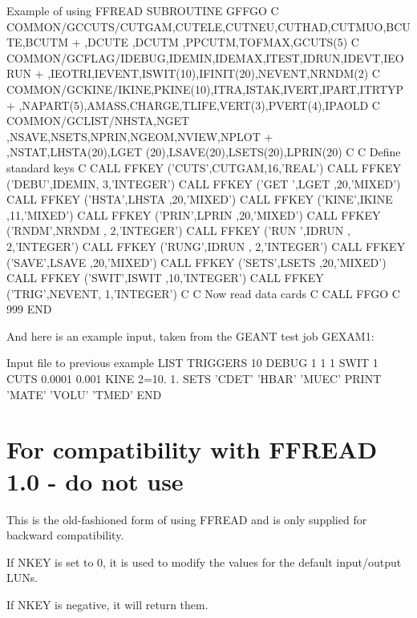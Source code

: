  
\begin{XMPt}{Example of using FFREAD}
      SUBROUTINE GFFGO
C
      COMMON/GCCUTS/CUTGAM,CUTELE,CUTNEU,CUTHAD,CUTMUO,BCUTE,BCUTM
     +             ,DCUTE ,DCUTM ,PPCUTM,TOFMAX,GCUTS(5)
C
      COMMON/GCFLAG/IDEBUG,IDEMIN,IDEMAX,ITEST,IDRUN,IDEVT,IEORUN
     +        ,IEOTRI,IEVENT,ISWIT(10),IFINIT(20),NEVENT,NRNDM(2)
C
      COMMON/GCKINE/IKINE,PKINE(10),ITRA,ISTAK,IVERT,IPART,ITRTYP
     +      ,NAPART(5),AMASS,CHARGE,TLIFE,VERT(3),PVERT(4),IPAOLD
C
      COMMON/GCLIST/NHSTA,NGET ,NSAVE,NSETS,NPRIN,NGEOM,NVIEW,NPLOT
     +       ,NSTAT,LHSTA(20),LGET (20),LSAVE(20),LSETS(20),LPRIN(20)
C
C             Define standard keys
C
      CALL FFKEY ('CUTS',CUTGAM,16,'REAL')
      CALL FFKEY ('DEBU',IDEMIN, 3,'INTEGER')
      CALL FFKEY ('GET ',LGET  ,20,'MIXED')
      CALL FFKEY ('HSTA',LHSTA ,20,'MIXED')
      CALL FFKEY ('KINE',IKINE ,11,'MIXED')
      CALL FFKEY ('PRIN',LPRIN ,20,'MIXED')
      CALL FFKEY ('RNDM',NRNDM , 2,'INTEGER')
      CALL FFKEY ('RUN ',IDRUN , 2,'INTEGER')
      CALL FFKEY ('RUNG',IDRUN , 2,'INTEGER')
      CALL FFKEY ('SAVE',LSAVE ,20,'MIXED')
      CALL FFKEY ('SETS',LSETS ,20,'MIXED')
      CALL FFKEY ('SWIT',ISWIT ,10,'INTEGER')
      CALL FFKEY ('TRIG',NEVENT, 1,'INTEGER')
C
C             Now read data cards
C
      CALL FFGO
C
 999  END

\end{XMPt}
 
 
And here is an example input, taken from the GEANT test job GEXAM1:
 
 
\begin{XMPt}{Input file to previous example}
LIST
TRIGGERS   10
DEBUG     1   1    1
SWIT      1
CUTS  0.0001    0.001
KINE 2=10. 1.
SETS    'CDET' 'HBAR'  'MUEC'
PRINT   'MATE' 'VOLU'  'TMED'
END
\end{XMPt}
 
\section{For compatibility with FFREAD 1.0 - do not use}
 
 
This is the old-fashioned form of using FFREAD and is
only supplied for backward compatibility.
 
If NKEY is set to 0, it is used to modify the values for
the default input/output LUNs.
 
If NKEY is negative, it will return them.
 

